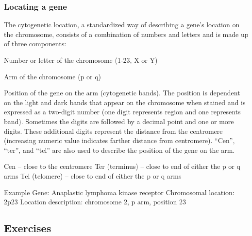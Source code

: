 \documentclass[11pt]{article}
\begin{document}
\subsubsection{Locating a gene}
\label{sec:orga54d42b}

The cytogenetic location, a standardized way of describing a gene’s location on the chromosome, consists of a combination of numbers and letters and is made up of three components:

Number or letter of the chromosome (1-23, X or Y)

Arm of the chromosome (p or q)

Position of the gene on the arm (cytogenetic bands). The position is dependent on the light and dark bands that appear on the chromosome when stained and is expressed as a two-digit number (one digit represents region and one represents band). Sometimes the digits are followed by a decimal point and one or more digits. These additional digits represent the distance from the centromere (increasing numeric value indicates farther distance from centromere). “Cen”, “ter”, and “tel” are also used to describe the position of the gene on the arm.

Cen – close to the centromere
Ter (terminus) – close to end of either the p or q arms
Tel (telomere) – close to end of either the p or q arms

Example
Gene: Anaplastic lymphoma kinase receptor
Chromosomal location: 2p23
Location description: chromosome 2, p arm, position 23

\subsection{Exercises}
\label{sec:org479623d}
\end{document}
